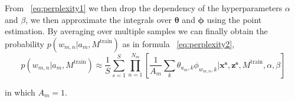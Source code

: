 
From ~\ref{eq:perplexity1} we then drop the dependency of the hyperparameters $\alpha$ and $\beta$, we then approximate the integrals over $\boldsymbol{\theta}$ and $\boldsymbol{\phi}$ using the point estimation. By averaging over multiple samples we can finally obtain the probability $p(w_{m,n}|a_m,M^\text{train})$ as in formula ~\ref{eq:perplexity2},
\begin{equation}\label{eq:perplexity2}
p(w_{m,n}|a_m,M^\text{train}) \approx \frac{1}{S} \sum_{s=1}^{S}\prod_{n=1}^{N_m}[\frac{1}{A_m}\sum_{k}\theta_{a_m,k}\phi_{w_{m,n},k}|\boldsymbol{x^s},\boldsymbol{z^s},M^\text{train},\alpha,\beta]
\end{equation}

in which $A_m = 1$. 
